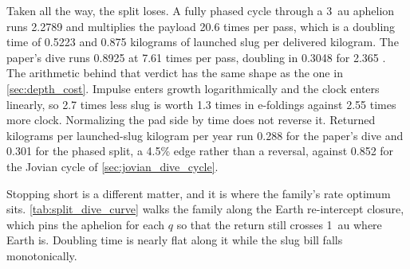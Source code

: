 \documentclass{article}
\begin{document}
Taken all the way, the split loses. A fully phased cycle through a \SI{3}{\astronomicalunit} aphelion runs \SI{2.2789}{\year} and multiplies the payload \num{20.6} times per pass, which is a doubling time of \SI{0.5223}{\year} and \num{0.875} kilograms of launched slug per delivered kilogram. The paper's dive runs \SI{0.8925}{\year} at \num{7.61} times per pass, doubling in \SI{0.3048}{\year} for \num{2.365} \cite{Katz_aim_is_all_you_need_2025}. The arithmetic behind that verdict has the same shape as the one in \autoref{sec:depth_cost}. Impulse enters growth logarithmically and the clock enters linearly, so 2.7 times less slug is worth 1.3 times in e-foldings against 2.55 times more clock. Normalizing the pad side by time does not reverse it. Returned kilograms per launched-slug kilogram per year run \num{0.288} for the paper's dive and \num{0.301} for the phased split, a 4.5\% edge rather than a reversal, against \num{0.852} for the Jovian cycle of \autoref{sec:jovian_dive_cycle}.

Stopping short is a different matter, and it is where the family's rate optimum sits. \autoref{tab:split_dive_curve} walks the family along the Earth re-intercept closure, which pins the aphelion for each $q$ so that the return still crosses \SI{1}{\astronomicalunit} where Earth is. Doubling time is nearly flat along it while the slug bill falls monotonically.
\end{document}
